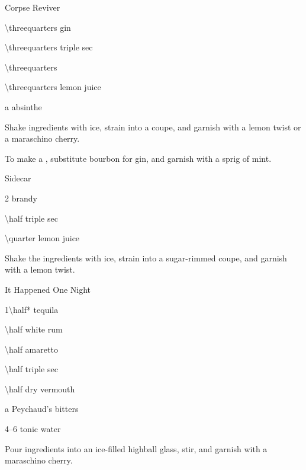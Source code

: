 \begin{Cocktail}{Corpse Reviver }
	\begin{Ingredients}
	\item \SI{\threequarters}{\oz} gin
	\item \SI{\threequarters}{\oz} triple sec
	\item \SI{\threequarters}{\oz} \Lillet
	\item \SI{\threequarters}{\oz} lemon juice
	\item a \si{\dash} absinthe
	\end{Ingredients}
	
	\begin{Instructions}\vspace{-3ex}
	Shake ingredients with ice, strain into a coupe, and garnish with a lemon twist or a maraschino cherry.
	
	To make a , substitute bourbon for gin, and garnish with a sprig of mint.
	\end{Instructions}
\end{Cocktail}



\begin{Cocktail}{Sidecar}
	\begin{Ingredients}
	\item \SI{2}{\oz} brandy
	\item \SI{\half}{\oz} triple sec
	\item \SI{\quarter}{\oz} lemon juice
	\end{Ingredients}
	
	\begin{Instructions}
	Shake the ingredients with ice, strain into a sugar-rimmed coupe, and garnish with a lemon twist.
	\end{Instructions}
\end{Cocktail}

\begin{Cocktail*}{It Happened One Night}
	\begin{Ingredients}\normalsize
	\item \SI{1\half*}{\oz} tequila
	\item \SI{\half}{\oz} white rum
	\item \SI{\half}{\oz} amaretto
	\item \SI{\half}{\oz} triple sec
	\item \SI{\half}{\oz} dry vermouth
	\item a \si{\dash} Peychaud's bitters
	\item \SIrange{4}{6}{\oz} tonic water
	\end{Ingredients}
	
	\begin{Instructions}
	Pour ingredients into an ice-filled highball glass, stir, and garnish with a maraschino cherry.
	\end{Instructions}
\end{Cocktail*}

